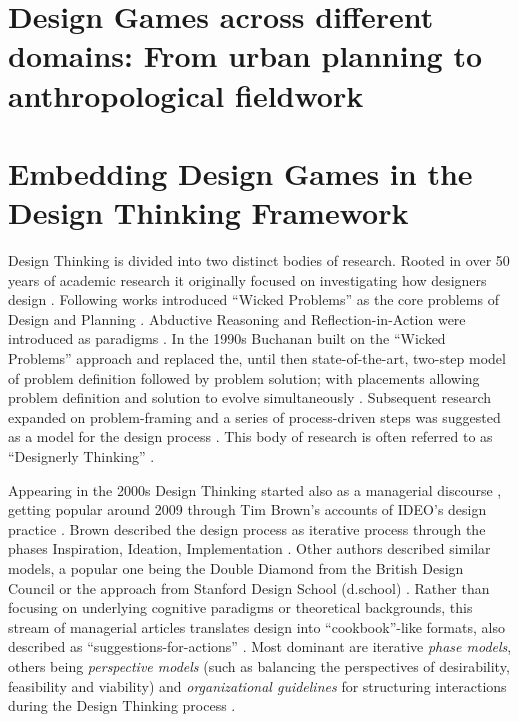 \documentclass[draft,twoside]{vutinfth}
\begin{document}
    \chapter{Design Games across different domains: From urban planning to anthropological fieldwork}

    \chapter{Embedding Design Games in the Design Thinking Framework}
        Design Thinking is divided into two distinct bodies of research. Rooted in over 50 years of 
        academic research \cite{johansson-skoldbergDesignThinkingPresent2013a} it originally focused on investigating 
        how designers design \cite{kimbellRethinkingDesignThinking2011}. Following works introduced ``Wicked Problems'' 
        as the core problems of Design \cite{nhuShortcomingsDesignThinking2019} and Planning \cite{rittelDilemmasGeneralTheory1973}. 
        Abductive Reasoning and Reflection-in-Action were introduced as paradigms \cite{nhuShortcomingsDesignThinking2019, schonReflectivePractitionerHow2009}. 
        In the 1990s Buchanan built on the ``Wicked Problems'' approach and replaced the, until then state-of-the-art, two-step 
        model of problem definition followed by problem solution; with placements allowing problem definition and solution 
        to evolve simultaneously \cite{johansson-skoldbergDesignThinkingPresent2013a}. Subsequent research expanded on problem-framing 
        \cite{weedonCoreKeesDorsts2019} and a series of process-driven steps was suggested as a model for the design process 
        \cite{johansson-skoldbergDesignThinkingPresent2013a}. This body of research is often referred to as ``Designerly Thinking'' 
        \cite{johansson-skoldbergDesignThinkingPresent2013a,nhuShortcomingsDesignThinking2019,kellyDesignThinkingComputational2021}. 

        Appearing in the 2000s Design Thinking started also as a managerial discourse \cite{johansson-skoldbergDesignThinkingPresent2013a}, 
        getting popular around 2009 through Tim Brown's accounts of IDEO's design practice  
        \cite{johansson-skoldbergDesignThinkingPresent2013a, brownDesignThinkingSocial2010}. Brown described the design process as 
        iterative process through the phases Inspiration, Ideation, Implementation \cite{brownDesignThinkingSocial2010}. Other authors 
        described similar models, a popular one being the Double Diamond from the British Design Council \cite{HistoryDoubleDiamond} or 
        the approach from Stanford Design School (d.school) \cite{micheliDoingDesignThinking2019}. Rather than focusing 
        on underlying cognitive paradigms or theoretical backgrounds, this stream of managerial articles translates design into ``cookbook''-like 
        formats, also described as ``suggestions-for-actions'' \cite{nhuShortcomingsDesignThinking2019}. Most dominant are iterative 
        \textit{phase models}, others being \textit{perspective models} (such as balancing the perspectives of desirability, feasibility and viability) 
        and \textit{organizational guidelines} for structuring interactions during the Design Thinking process \cite{nhuShortcomingsDesignThinking2019}. 
\end{document}
